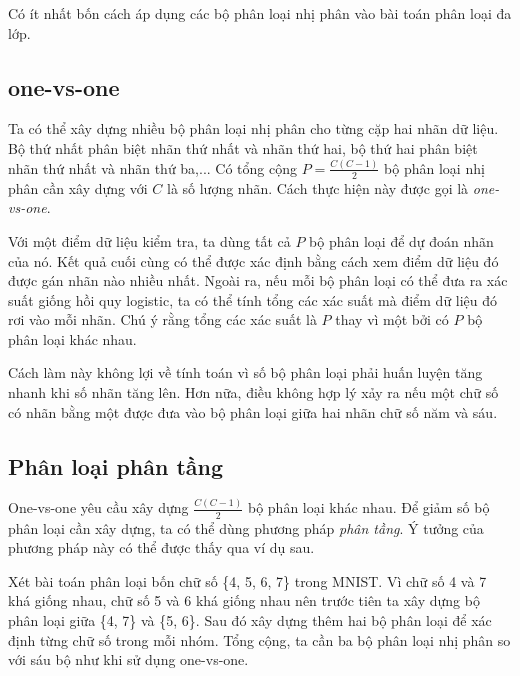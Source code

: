 
Có {ít nhất} bốn cách áp dụng các bộ phân loại nhị phân vào bài toán phân
loại đa lớp.%

\subsection{one-vs-one}

Ta có thể xây dựng nhiều bộ phân loại nhị phân cho từng cặp hai nhãn dữ liệu. Bộ
thứ nhất phân biệt nhãn thứ nhất và nhãn thứ hai, bộ thứ hai phân biệt nhãn thứ
nhất và nhãn thứ ba,... Có tổng cộng $P = \frac{C(C-1)}{2}$ bộ phân loại nhị phân
cần xây dựng với $C$ là số lượng nhãn. Cách thực hiện này được gọi là
\textit{one-vs-one}.

Với một điểm dữ liệu kiểm tra, ta dùng tất cả $P$ bộ phân loại để dự đoán nhãn của nó. Kết quả cuối cùng có thể được xác định bằng cách
xem điểm dữ liệu đó được gán nhãn nào nhiều nhất. Ngoài ra, nếu mỗi bộ phân loại có thể đưa ra xác suất giống hồi quy logistic, ta có thể tính {tổng các xác suất} mà điểm dữ liệu đó rơi vào mỗi nhãn. Chú ý rằng tổng các xác suất là $P$ thay vì một bởi có $P$ bộ phân loại khác nhau.


Cách làm này không lợi về tính toán vì số bộ phân loại phải huấn luyện tăng
nhanh khi số nhãn tăng lên. Hơn nữa, điều không hợp lý xảy ra nếu một chữ số có nhãn bằng một được đưa vào bộ phân loại giữa hai nhãn chữ số năm và sáu.

\subsection{Phân loại phân tầng}
One-vs-one yêu cầu xây dựng $\frac{C(C-1)}{2}$ bộ phân loại khác nhau. Để giảm
số bộ phân loại cần xây dựng, ta có thể dùng phương pháp \textit{phân tầng}. Ý
tưởng của phương pháp này có thể được thấy qua ví dụ sau.

Xét bài toán phân loại bốn chữ số \{4, 5, 6, 7\} trong
MNIST. Vì chữ số {4} và {7} khá giống nhau, chữ số
{5} và {6} khá giống nhau nên trước tiên ta xây dựng
bộ phân loại giữa \{4, 7\} và \{5, 6\}. Sau đó xây dựng thêm hai bộ phân loại
để xác định từng chữ số trong mỗi nhóm. Tổng cộng, ta cần ba bộ phân loại nhị phân so với sáu bộ như khi sử dụng one-vs-one.

